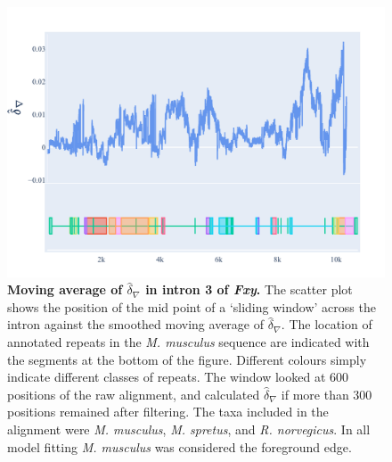 \begin{figure}[htbp]
\centering
\includegraphics[width=\textwidth]{figures/plots/rodent/dconv-intron3.pdf}
\caption{\textbf{Moving average of $\hat\delta_\nabla$ in intron 3 of \textit{Fxy}.} The scatter plot shows the position of the mid point of a `sliding window' across the intron against the smoothed moving average of $\hat\delta_\nabla$. The location of annotated repeats in the \textit{M. musculus} sequence are indicated with the segments at the bottom of the figure. Different colours simply indicate different classes of repeats. The window looked at 600 positions of the raw alignment, and calculated $\hat\delta_\nabla$ if more than 300 positions remained after filtering. The taxa included in the alignment were \textit{M. musculus}, \textit{M. spretus}, and \textit{R. norvegicus}. In all model fitting \textit{M. musculus} was considered the foreground edge. }
\label{fig:rodent/d-conv/intron3}
\end{figure}